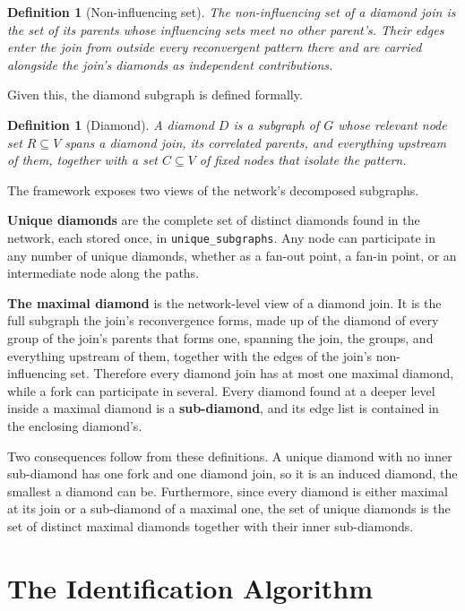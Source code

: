 \documentclass[12pt]{report}
\newtheorem{definition}[theorem]{Definition}
\begin{document}
\begin{definition}[Non-influencing set]
\label{def:nondi}
The \emph{non-influencing set} of a diamond join is the set of its parents whose influencing sets meet no other parent's. Their edges enter the join from outside every reconvergent pattern there and are carried alongside the join's diamonds as independent contributions.
\end{definition}

Given this, the diamond subgraph is defined formally.

\begin{definition}[Diamond]
\label{def:diamond}
A diamond $D$ is a subgraph of $G$ whose relevant node set $R \subseteq V$ spans a diamond join, its correlated parents, and everything upstream of them, together with a set $C \subseteq V$ of fixed nodes that isolate the pattern.
\end{definition}

The framework exposes two views of the network's decomposed subgraphs.

\textbf{Unique diamonds} are the complete set of distinct diamonds found in the network, each stored once, in \texttt{unique\_subgraphs}. Any node can participate in any number of unique diamonds, whether as a fan-out point, a fan-in point, or an intermediate node along the paths.

\textbf{The maximal diamond} is the network-level view of a diamond join. It is the full subgraph the join's reconvergence forms, made up of the diamond of every group of the join's parents that forms one, spanning the join, the groups, and everything upstream of them, together with the edges of the join's non-influencing set. Therefore every diamond join has at most one maximal diamond, while a fork can participate in several. Every diamond found at a deeper level inside a maximal diamond is a \textbf{sub-diamond}, and its edge list is contained in the enclosing diamond's.

Two consequences follow from these definitions. A unique diamond with no inner sub-diamond has one fork and one diamond join, so it is an induced diamond, the smallest a diamond can be. Furthermore, since every diamond is either maximal at its join or a sub-diamond of a maximal one, the set of unique diamonds is the set of distinct maximal diamonds together with their inner sub-diamonds.

\section{The Identification Algorithm}
\label{sec:dd-algorithm}
\end{document}
